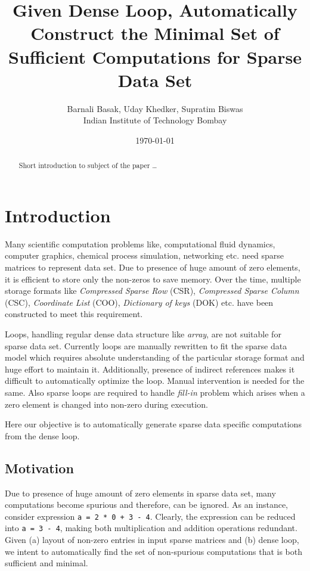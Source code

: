 \documentclass[a4paper,12pt]{article}
\title{Given Dense Loop, Automatically Construct the Minimal Set of Sufficient Computations for Sparse Data Set}
\author{Barnali Basak, Uday Khedker, Supratim Biswas  \\
	Indian Institute of Technology Bombay  \\
	}
\date{\today}
\begin{document}
\maketitle

\begin{abstract}
Short introduction to subject of the paper \ldots 
\end{abstract}

\section{Introduction}
Many scientific computation problems like, computational fluid dynamics,
computer graphics, chemical process simulation, networking etc. need
sparse matrices to represent data set. Due to presence of huge amount of zero
elements, it is efficient to store only the non-zeros to save memory. Over the time,
multiple storage formats like \emph{Compressed Sparse Row} (CSR), 
\emph{Compressed Sparse Column} (CSC), \emph{Coordinate List} (COO), 
\emph{Dictionary of keys} (DOK) etc. have been constructed to meet this
requirement. 

Loops, handling regular dense data structure like \emph{array}, are not 
suitable for sparse data set. Currently loops are manually rewritten to fit
the sparse data model which requires absolute understanding of
the particular storage format and huge effort to maintain it.
Additionally, presence of indirect references makes it difficult to automatically
optimize the loop. Manual intervention is needed for the same. Also sparse
loops are required to handle \emph{fill-in} problem which arises when a zero
element is changed into non-zero during execution. 

Here our objective is to automatically generate sparse data specific
computations from the dense loop. 
\subsection{Motivation}
Due to presence of huge amount of zero elements in sparse data set, many computations 
become spurious and therefore, can be ignored. 
As an instance, consider expression {\tt a = 2 * 0 + 3 - 4}. Clearly, the
expression can be reduced into {\tt a = 3 - 4}, making both multiplication and
addition operations redundant.
Given (a) layout of non-zero entries in input sparse matrices and 
(b) dense loop, we intent to automatically find the set of non-spurious
computations that is both sufficient and minimal. 
\end{document}
